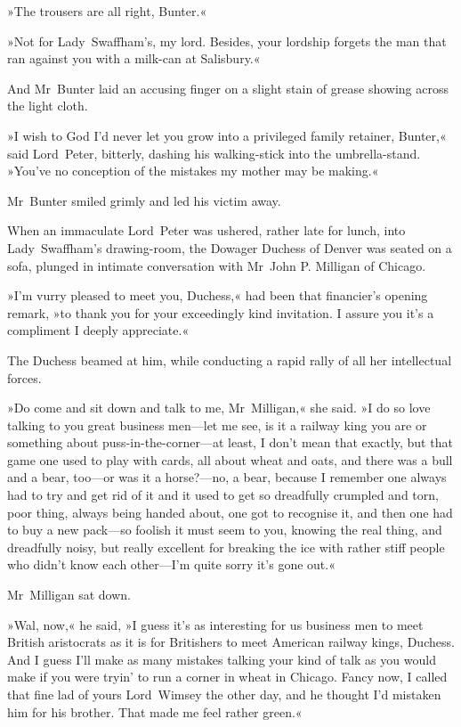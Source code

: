 »The trousers are all right, Bunter.«

»Not for Lady~Swaffham's, my lord. Besides, your lordship forgets the man that ran against you with a milk-can at Salisbury.«

And Mr~Bunter laid an accusing finger on a slight stain of grease showing across the light cloth.

»I wish to God I'd never let you grow into a privileged family retainer, Bunter,« said Lord~Peter, bitterly, dashing his walking-stick into the umbrella-stand. »You've no conception of the mistakes my mother may be making.«

Mr~Bunter smiled grimly and led his victim away.

When an immaculate Lord~Peter was ushered, rather late for lunch, into Lady~Swaffham's drawing-room, the Dowager Duchess of Denver was seated on a sofa, plunged in intimate conversation with Mr~John P. Milligan of Chicago.

»I'm vurry pleased to meet you, Duchess,« had been that financier's opening remark, »to thank you for your exceedingly kind invitation. I assure you it's a compliment I deeply appreciate.«

The Duchess beamed at him, while conducting a rapid rally of all her intellectual forces.

»Do come and sit down and talk to me, Mr~Milligan,« she said. »I do so love talking to you great business men—let me see, is it a railway king you are or something about puss-in-the-corner—at least, I don't mean that exactly, but that game one used to play with cards, all about wheat and oats, and there was a bull and a bear, too—or was it a horse?---no, a bear, because I remember one always had to try and get rid of it and it used to get so dreadfully crumpled and torn, poor thing, always being handed about, one got to recognise it, and then one had to buy a new pack—so foolish it must seem to you, knowing the real thing, and dreadfully noisy, but really excellent for breaking the ice with rather stiff people who didn't know each other—I'm quite sorry it's gone out.«

Mr~Milligan sat down.

»Wal, now,« he said, »I guess it's as interesting for us business men to meet British aristocrats as it is for Britishers to meet American railway kings, Duchess. And I guess I'll make as many mistakes talking your kind of talk as you would make if you were tryin' to run a corner in wheat in Chicago. Fancy now, I called that fine lad of yours Lord~Wimsey the other day, and he thought I'd mistaken him for his brother. That made me feel rather green.«

